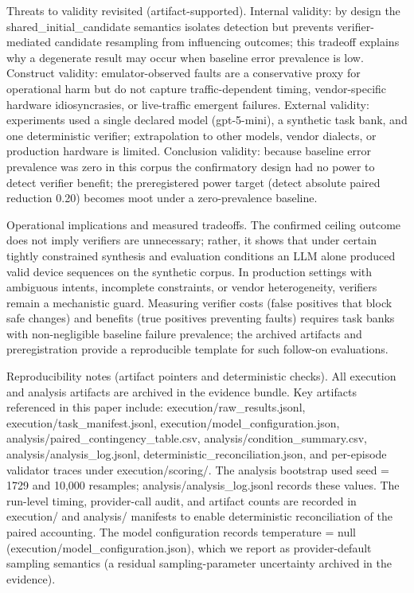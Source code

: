 \documentclass[conference]{IEEEtran}
\begin{document}
Threats to validity revisited (artifact-supported). Internal validity: by design the shared\_initial\_candidate semantics isolates detection but prevents verifier-mediated candidate resampling from influencing outcomes; this tradeoff explains why a degenerate result may occur when baseline error prevalence is low. Construct validity: emulator-observed faults are a conservative proxy for operational harm but do not capture traffic-dependent timing, vendor-specific hardware idiosyncrasies, or live-traffic emergent failures. External validity: experiments used a single declared model (gpt-5-mini), a synthetic task bank, and one deterministic verifier; extrapolation to other models, vendor dialects, or production hardware is limited. Conclusion validity: because baseline error prevalence was zero in this corpus the confirmatory design had no power to detect verifier benefit; the preregistered power target (detect absolute paired reduction 0.20) becomes moot under a zero-prevalence baseline.

Operational implications and measured tradeoffs. The confirmed ceiling outcome does not imply verifiers are unnecessary; rather, it shows that under certain tightly constrained synthesis and evaluation conditions an LLM alone produced valid device sequences on the synthetic corpus. In production settings with ambiguous intents, incomplete constraints, or vendor heterogeneity, verifiers remain a mechanistic guard. Measuring verifier costs (false positives that block safe changes) and benefits (true positives preventing faults) requires task banks with non-negligible baseline failure prevalence; the archived artifacts and preregistration provide a reproducible template for such follow-on evaluations.

Reproducibility notes (artifact pointers and deterministic checks). All execution and analysis artifacts are archived in the evidence bundle. Key artifacts referenced in this paper include: execution/raw\_results.jsonl, execution/task\_manifest.jsonl, execution/model\_configuration.json, analysis/paired\_contingency\_table.csv, analysis/condition\_summary.csv, analysis/analysis\_log.jsonl, deterministic\_reconciliation.json, and per-episode validator traces under execution/scoring/. The analysis bootstrap used seed = 1729 and 10,000 resamples; analysis/analysis\_log.jsonl records these values. The run-level timing, provider-call audit, and artifact counts are recorded in execution/ and analysis/ manifests to enable deterministic reconciliation of the paired accounting. The model configuration records temperature = null (execution/model\_configuration.json), which we report as provider-default sampling semantics (a residual sampling-parameter uncertainty archived in the evidence).
\end{document}
